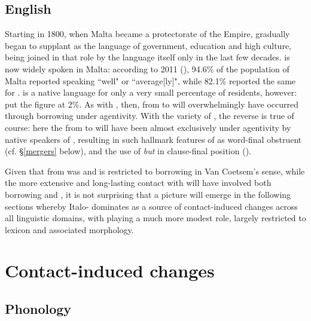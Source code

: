 \documentclass[output=paper]{langsci/langscibook}
\begin{document}
\subsection{English} \label{English}
Starting in 1800, when Malta became a protectorate of the  Empire,  gradually began to supplant  as the language of government, education and high culture, being joined in that role by the  language itself only in the last few decades.  is now widely spoken in Malta: according to 2011  (\citealt[149]{census2011}), 94.6\% of the population of Malta reported speaking  ``well" or ``average[ly]", while 82.1\% reported the same for .  is a native language for only a very small percentage of  residents, however: \cite{scirihavassallo2006} put the figure at 2\%. As with , then,  from  to  will overwhelmingly have occurred through borrowing under  agentivity. With the  variety of , the reverse is true of course: here the  from  to  will have been almost exclusively  under   agentivity by native speakers of , resulting in such hallmark features of   as word-final obstruent  (cf. §\ref{mergers} below), and the use of \textit{but} in clause-final position (\citealt[527]{Lucas2015}).

Given that  from  was and is restricted to borrowing in Van Coetsem's sense, while the more extensive and long-lasting contact with  will have involved both borrowing and , it is not surprising that a picture will emerge in the following sections whereby Italo- dominates as a source of contact-induced changes across all linguistic domains, with  playing a much more modest role, largely restricted to lexicon and associated  morphology.

\section{Contact-induced changes
}
\subsection{Phonology\footnotemark}
\end{document}
